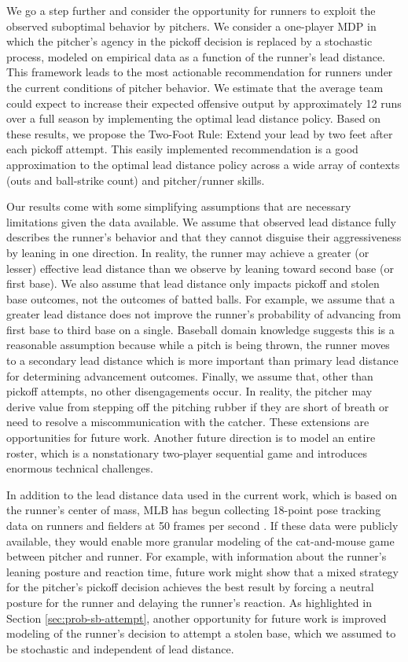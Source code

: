\documentclass[11pt]{article}
\begin{document}
    We go a step further and consider the opportunity for runners to exploit the observed suboptimal behavior by pitchers. We consider a one-player MDP in which the pitcher's agency in the pickoff decision is replaced by a stochastic process, modeled on empirical data as a function of the runner's lead distance.  This framework leads to the most actionable recommendation for runners under the current conditions of pitcher behavior. We estimate that the average team could expect to increase their expected offensive output by approximately 12 runs over a full season by implementing the optimal lead distance policy. Based on these results, we propose the Two-Foot Rule: Extend your lead by two feet after each pickoff attempt. This easily implemented recommendation is a good approximation to the optimal lead distance policy across a wide array of contexts (outs and ball-strike count) and pitcher/runner skills.

    Our results come with some simplifying assumptions that are necessary limitations given the data available. We assume that observed lead distance fully describes the runner's behavior and that they cannot disguise their aggressiveness by leaning in one direction. In reality, the runner may achieve a greater (or lesser) effective lead distance than we observe by leaning toward second base (or first base). We also assume that lead distance only impacts pickoff and stolen base outcomes, not the outcomes of batted balls. For example, we assume that a greater lead distance does not improve the runner's probability of advancing from first base to third base on a single. Baseball domain knowledge suggests this is a reasonable assumption because while a pitch is being thrown, the runner moves to a secondary lead distance which is more important than primary lead distance for determining advancement outcomes. Finally, we assume that, other than pickoff attempts, no other disengagements occur. In reality, the pitcher may derive value from stepping off the pitching rubber if they are short of breath or need to resolve a miscommunication with the catcher. These extensions are opportunities for future work. Another future direction is to model an entire roster, which is a nonstationary two-player sequential game and introduces enormous technical challenges.

    In addition to the lead distance data used in the current work, which is based on the runner's center of mass, MLB has begun collecting 18-point pose tracking data on runners and fielders at 50 frames per second \parencite{jedlovec_introducing_2020}. If these data were publicly available, they would enable more granular modeling of the cat-and-mouse game between pitcher and runner. For example, with information about the runner's leaning posture and reaction time, future work might show that a mixed strategy for the pitcher's pickoff decision achieves the best result by forcing a neutral posture for the runner and delaying the runner's reaction. As highlighted in Section \ref{sec:prob-sb-attempt}, another opportunity for future work is improved modeling of the runner's decision to attempt a stolen base, which we assumed to be stochastic and independent of lead distance.
\end{document}
